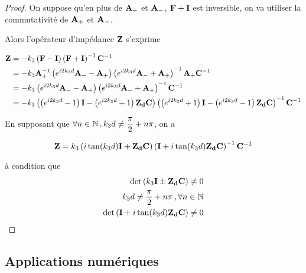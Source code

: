 \begin{proof}
            On suppose qu'en plus de $\mathbf{A}_+$ et $\mathbf{A}_-$, $\mathbf{F} + \mathbf{I}$ est inversible, on va utiliser la commutativité de $\mathbf{A}_+$ et $\mathbf{A}_-$.

            Alors l'opérateur d'impédance $\mathbf{Z}$ s'exprime

            \begin{align}
                \mathbf{Z}
                &=-k_3\left(\mathbf{F} - \mathbf{I} \right)\left(\mathbf{F}+ \mathbf{I} \right)^{-1}\mathbf{C}^{-1}
                \\
                &=-k_3\mathbf{A}_+^{-1}\left(e^{i2 k_3 d}\mathbf{A}_- - \mathbf{A}_+ \right)\left(e^{i2 k_3 d}\mathbf{A}_- + \mathbf{A}_+ \right)^{-1}\mathbf{A}_+\mathbf{C}^{-1}
                \\
                &= -k_3\left( e^{i2 k_3 d} \mathbf{A}_- -  \mathbf{A}_+\right)
                \left( e^{i2 k_3 d} \mathbf{A}_- + \mathbf{A}_+ \right)^{-1}\mathbf{C}^{-1}
                \\
                &= -k_3\left(\left( e^{i2 k_3 d} - 1 \right)\mathbf{I} - \left( e^{i2 k_3 d} + 1 \right) \mathbf{Z_d}\mathbf{C} \right)
                \left( \left( e^{i2 k_3 d} + 1 \right)\mathbf{I} - \left( e^{i2 k_3 d} - 1 \right)\mathbf{Z_d}\mathbf{C} \right)^{-1}\mathbf{C}^{-1}   
            \end{align}

            En supposant que $\forall n \in \mathbb N \,, k_3d\not = \dfrac{\pi}{2}+n\pi$, on a

            \begin{equation}
            \mathbf{Z} = k_3\left(i\tan(k_3 d)\mathbf{I} + \mathbf{Z_d}\mathbf{C} \right)
                \left( \mathbf{I} + i\tan(k_3 d)\mathbf{Z_d}\mathbf{C} \right)^{-1}\mathbf{C}^{-1} 
            \end{equation}

            à condition que 
            \begin{align}
                \det\left(k_3\mathbf{I} \pm \mathbf{Z_d}\mathbf{C} \right) \not = 0 \\
                k_3d\not = \dfrac{\pi}{2}+n\pi\,, \forall n \in \mathbb N \\
                \det\left(\mathbf{I} + i\tan(k_3d)\mathbf{Z_d}\mathbf{C}\right) \not = 0
            \end{align}

        \end{proof}


    \subsection{Applications numériques}

